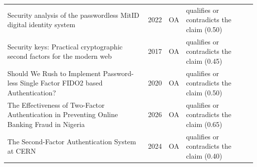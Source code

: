 \begin{longtable}{@{}%
  >{\raggedright\arraybackslash}p{}c%
  >{\raggedright\arraybackslash}p{}%
  >{\raggedright\arraybackslash}p{}@{}}
Security analysis of the passwordless MitID digital identity system & 2022 & OA & qualifies or contradicts the claim (0.50) \\
Security keys: Practical cryptographic second factors for the modern web & 2017 & OA & qualifies or contradicts the claim (0.45) \\
Should We Rush to Implement Password-less Single Factor FIDO2 based Authentication? & 2020 & OA & qualifies or contradicts the claim (0.50) \\
The Effectiveness of Two-Factor Authentication in Preventing Online Banking Fraud in Nigeria & 2026 & OA & qualifies or contradicts the claim (0.65) \\
The Second-Factor Authentication System at CERN & 2024 & OA & qualifies or contradicts the claim (0.40) \\
\end{longtable}
\endgroup
